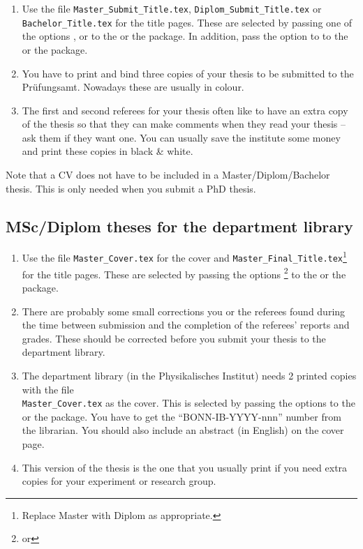 \begin{enumerate}
\item Use the file \texttt{Master\_Submit\_Title.tex},
  \texttt{Diplom\_Submit\_Title.tex} or\\
  \texttt{Bachelor\_Title.tex} for the title pages.
  These are selected by passing one of the options
  ,  or 
  to the  or the  package.
  In addition, pass the option  to 
  to the  or the  package.
\item You have to print and bind three copies of your thesis
  to be submitted to the
  \foreignlanguage{ngerman}{Prüfungsamt}. Nowadays these are usually in
  colour.
\item The first and second referees for your thesis often like to
  have an extra copy of the thesis so that they can make comments when they read
  your thesis -- ask them if they want one. You can usually save the
  institute some money and print these copies in black \& white.
\end{enumerate}

Note that a CV does not have to be included in a Master/Diplom/Bachelor
thesis. This is only needed when you submit a PhD thesis.


\subsection{MSc/Diplom theses for the department library}

\begin{enumerate}
\item Use the file \texttt{Master\_Cover.tex} for the cover and
  \texttt{Master\_Final\_Title.tex}\footnote{Replace Master with Diplom
    as appropriate.} for the title pages.
  These are selected by passing the options \footnote{%
    or }
  to the  or the  package.
\item There are probably some small corrections you or the referees
  found during the time between submission and the completion of the
  referees' reports and grades. These should be corrected before you
  submit your thesis to the department library.
\item The department
  library (in the Physikalisches
  Institut) needs 2 printed copies with the file\\
  \texttt{Master\_Cover.tex} as the cover.
  This is selected by passing the options 
  to the  or the  package.
  You have to get
  the \enquote{BONN-IB-YYYY-nnn} number from the librarian. You
  should also include an abstract (in English) on the cover page.
\item This version of the thesis is the one that you usually print if
  you need extra copies for your experiment or research group.
\end{enumerate}


